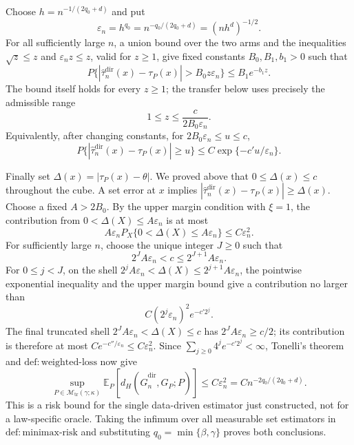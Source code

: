 Choose \(h=n^{-1/(2q_0+d)}\) and put
\[
\varepsilon_n=h^{q_0}=n^{-q_0/(2q_0+d)}=(nh^d)^{-1/2}.
\]
For all sufficiently large \(n\), a union bound over the two arms and the inequalities \(\sqrt z\le z\) and \(\varepsilon_n z\le z\), valid for \(z\ge1\), give fixed constants \(B_0,B_1,b_1>0\) such that
\[
P\{|\widehat\tau_n^{\mathrm{dir}}(x)-\tau_P(x)|>B_0z\varepsilon_n\}
\le B_1e^{-b_1z}.
\]
The bound itself holds for every \(z\ge1\); the transfer below uses precisely the admissible range
\[
1\le z\le\frac{c}{2B_0\varepsilon_n}.
\]
Equivalently, after changing constants, for \(2B_0\varepsilon_n\le u\le c\),
\[
P\{|\widehat\tau_n^{\mathrm{dir}}(x)-\tau_P(x)|\ge u\}
\le C\exp\{-c'u/\varepsilon_n\}.
\]

Finally set \(\Delta(x)=|\tau_P(x)-\theta|\). We proved above that \(0\le\Delta(x)\le c\) throughout the cube. A set error at \(x\) implies \(|\widehat\tau_n^{\mathrm{dir}}(x)-\tau_P(x)|\ge\Delta(x)\). Choose a fixed \(A>2B_0\). By the upper margin condition with \(\xi=1\), the contribution from \(0<\Delta(X)\le A\varepsilon_n\) is at most
\[
A\varepsilon_nP_X\{0<\Delta(X)\le A\varepsilon_n\}
\le C\varepsilon_n^2.
\]
For sufficiently large \(n\), choose the unique integer \(J\ge0\) such that
\[
2^JA\varepsilon_n<c\le2^{J+1}A\varepsilon_n.
\]
For \(0\le j<J\), on the shell \(2^jA\varepsilon_n<\Delta(X)\le2^{j+1}A\varepsilon_n\), the pointwise exponential inequality and the upper margin bound give a contribution no larger than
\[
C(2^j\varepsilon_n)^2e^{-c'2^j}.
\]
The final truncated shell \(2^JA\varepsilon_n<\Delta(X)\le c\) has \(2^JA\varepsilon_n\ge c/2\); its contribution is therefore at most \(Ce^{-c''/\varepsilon_n}\le C\varepsilon_n^2\). Since \(\sum_{j\ge0}4^je^{-c'2^j}<\infty\), Tonelli's theorem and \(\mathrm{def:weighted\text{-}loss}\) now give
\[
\sup_{P\in\mathcal M_{\mathrm{tr}}(\gamma;\kappa)}
\mathbb E_P[d_H(\widehat G_n^{\mathrm{dir}},G_P;P)]
\le C\varepsilon_n^2
=Cn^{-2q_0/(2q_0+d)}.
\]
This is a risk bound for the single data-driven estimator just constructed, not for a law-specific oracle. Taking the infimum over all measurable set estimators in \(\mathrm{def:minimax\text{-}risk}\) and substituting \(q_0=\min\{\beta,\gamma\}\) proves both conclusions.